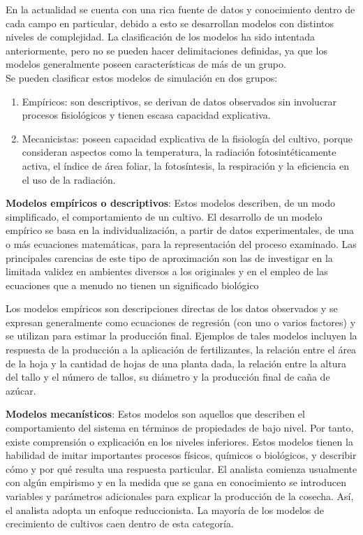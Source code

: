 En la actualidad se cuenta con una rica fuente de datos y conocimiento dentro de cada campo en particular, debido a esto se desarrollan modelos con distintos niveles de complejidad. La clasificación de los modelos ha sido intentada anteriormente, pero no se pueden hacer delimitaciones definidas, ya que los modelos generalmente poseen características de más de un grupo. \parencite{galvez2008modelacion, hernandez2009modelos}\\

Se pueden clasificar estos modelos de simulación en dos grupos:
\begin{enumerate}
	\item Empíricos: son descriptivos, se derivan de datos observados sin involucrar procesos fisiológicos y tienen escasa capacidad explicativa.
	\item Mecanicistas: poseen capacidad explicativa de la fisiología del cultivo, porque consideran aspectos como la temperatura, la radiación fotosintéticamente activa, el índice de área foliar, la fotosíntesis, la respiración y la eficiencia en el uso de la radiación. \parencite{refugio2004modelos}
\end{enumerate}

\textbf{Modelos empíricos o descriptivos}: Estos modelos describen, de un modo simplificado, el comportamiento de un cultivo.
El desarrollo de un modelo empírico se basa en la individualización, a partir de datos experimentales, de una o más ecuaciones matemáticas, para la representación del proceso examinado. Las principales carencias de este tipo de aproximación son las de investigar en la limitada validez en ambientes diversos a los originales y en el empleo de las ecuaciones que a menudo no tienen un significado biológico \parencite{bandi2003instrumentos}

Los modelos empíricos son descripciones directas de los datos observados y se expresan generalmente como ecuaciones de regresión (con uno o varios factores) y se utilizan para estimar la producción final. Ejemplos de tales modelos incluyen la respuesta de la producción a la aplicación de fertilizantes, la relación entre el área de la hoja y la cantidad de hojas de una planta dada, la relación entre la altura del tallo y el número de tallos, su diámetro y la producción final de caña de azúcar. \parencite{galvez2008modelacion}

\textbf{Modelos mecanísticos}: Estos modelos son aquellos que describen el comportamiento del sistema en términos de propiedades de bajo nivel. Por tanto, existe comprensión o explicación en los niveles inferiores. Estos modelos tienen la habilidad de imitar importantes procesos físicos, químicos o biológicos, y describir cómo y por qué resulta una respuesta particular. El analista comienza usualmente con algún empirismo y en la medida que se gana en conocimiento se introducen variables y parámetros adicionales para explicar la producción de la cosecha. Así, el analista adopta un enfoque reduccionista. La mayoría de los modelos de crecimiento de cultivos caen dentro de esta categoría. \parencite{galvez2008modelacion}

